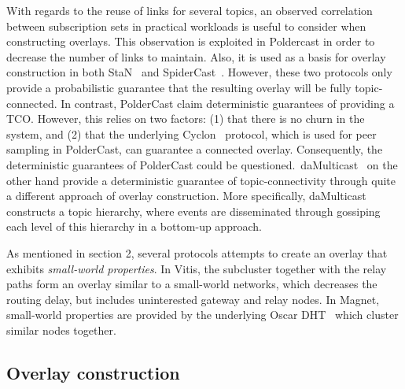 With regards to the reuse of links for several topics, an observed
correlation~\cite{Liu:2005} between subscription sets in practical
workloads is useful to consider when constructing overlays. This
observation is exploited in Poldercast in order to decrease the number of
links to maintain. Also, it is used as a basis for overlay construction
in both StaN~\cite{Matos:2010} and SpiderCast~\cite{Chockler:2007}.
However, these two protocols only provide a probabilistic guarantee that
the resulting overlay will be fully topic-connected. In contrast,
PolderCast claim deterministic guarantees of providing a TCO. However,
this relies on two factors: (1) that there is no churn in the system,
and (2) that the underlying Cyclon~\cite{Voulgaris:2005} protocol, which
is used for peer sampling in PolderCast, can guarantee a connected
overlay.  Consequently, the deterministic guarantees of PolderCast could
be questioned.\ daMulticast~\cite{Baehni:2004} on the other hand provide
a deterministic guarantee of topic-connectivity through quite a
different approach of overlay construction. More specifically,
daMulticast constructs a topic hierarchy, where events are disseminated
through gossiping each level of this hierarchy in a bottom-up approach.

As mentioned in section 2, several protocols attempts to create an overlay that
exhibits \emph{small-world properties}. In Vitis, the subcluster
together with the relay paths form an overlay similar to a small-world
networks, which decreases the routing delay, but includes
uninterested gateway and relay nodes. In Magnet, small-world properties
are provided by the underlying Oscar DHT~\cite{girdzijauskas2007oscar}
which cluster similar nodes together.

\subsection{Overlay construction}


